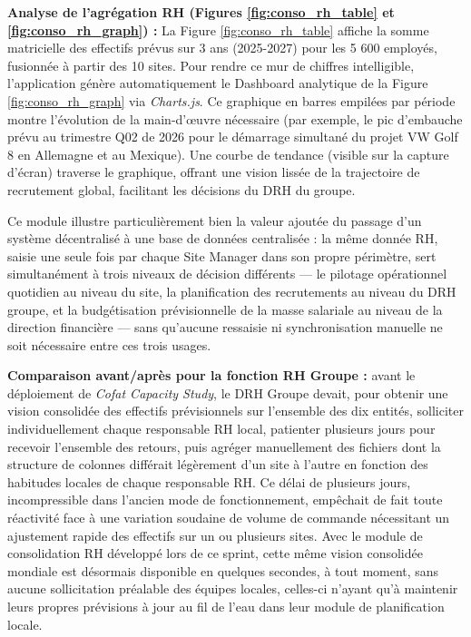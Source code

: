 \textbf{Analyse de l'agrégation RH (Figures \ref{fig:conso_rh_table} et \ref{fig:conso_rh_graph}) :}
La Figure \ref{fig:conso_rh_table} affiche la somme matricielle des effectifs prévus sur 3 ans (2025-2027) pour les 5 600 employés, fusionnée à partir des 10 sites. 
Pour rendre ce mur de chiffres intelligible, l'application génère automatiquement le Dashboard analytique de la Figure \ref{fig:conso_rh_graph} via \textit{Charts.js}. Ce graphique en barres empilées par période montre l'évolution de la main-d'œuvre nécessaire (par exemple, le pic d'embauche prévu au trimestre Q02 de 2026 pour le démarrage simultané du projet VW Golf 8 en Allemagne et au Mexique). Une courbe de tendance (visible sur la capture d'écran) traverse le graphique, offrant une vision lissée de la trajectoire de recrutement global, facilitant les décisions du DRH du groupe.

Ce module illustre particulièrement bien la valeur ajoutée du passage d'un système décentralisé à une base de données centralisée : la même donnée RH, saisie une seule fois par chaque Site Manager dans son propre périmètre, sert simultanément à trois niveaux de décision différents — le pilotage opérationnel quotidien au niveau du site, la planification des recrutements au niveau du DRH groupe, et la budgétisation prévisionnelle de la masse salariale au niveau de la direction financière — sans qu'aucune ressaisie ni synchronisation manuelle ne soit nécessaire entre ces trois usages.

\textbf{Comparaison avant/après pour la fonction RH Groupe :} avant le déploiement de \textit{Cofat Capacity Study}, le DRH Groupe devait, pour obtenir une vision consolidée des effectifs prévisionnels sur l'ensemble des dix entités, solliciter individuellement chaque responsable RH local, patienter plusieurs jours pour recevoir l'ensemble des retours, puis agréger manuellement des fichiers dont la structure de colonnes différait légèrement d'un site à l'autre en fonction des habitudes locales de chaque responsable RH. Ce délai de plusieurs jours, incompressible dans l'ancien mode de fonctionnement, empêchait de fait toute réactivité face à une variation soudaine de volume de commande nécessitant un ajustement rapide des effectifs sur un ou plusieurs sites. Avec le module de consolidation RH développé lors de ce sprint, cette même vision consolidée mondiale est désormais disponible en quelques secondes, à tout moment, sans aucune sollicitation préalable des équipes locales, celles-ci n'ayant qu'à maintenir leurs propres prévisions à jour au fil de l'eau dans leur module de planification locale.

